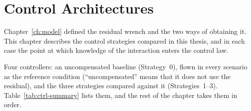 %
%
%
%
%

\chapter{Control Architectures}
\label{ch:control}

Chapter~\ref{ch:model} defined the residual wrench and the two ways of obtaining it. This
chapter describes the control strategies compared in this thesis, and in each case the point
at which knowledge of the interaction enters the control law.

Four controllers: an uncompensated baseline (Strategy~0), flown in every scenario as the
reference condition (``uncompensated'' means that it does not use the residual), and the three strategies compared against it (Strategies~1--3).
Table~\ref{tab:ctrl-summary} lists them, and the rest of the chapter takes them in order.

